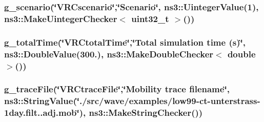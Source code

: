 \subsubsection[{\texorpdfstring{g\+\_\+scenario}{g_scenario}}]{ g\+\_\+scenario(\char`\"{}V\+R\+Cscenario\char`\"{},\char`\"{}Scenario\char`\"{}, ns3\+::\+Uinteger\+Value(1), {\bf ns3\+::\+Make\+Uinteger\+Checker}$<$ uint32\+\_\+t $>$())\hspace{0.3cm}{\ttfamily [static]}}\hypertarget{vanet-routing-compare_8cc_a85759f8a43510eb0868b9089f96b3cda}{}\label{vanet-routing-compare_8cc_a85759f8a43510eb0868b9089f96b3cda}
\subsubsection[{\texorpdfstring{g\+\_\+total\+Time}{g_totalTime}}]{ g\+\_\+total\+Time(\char`\"{}V\+R\+Ctotal\+Time\char`\"{},\char`\"{}Total simulation time ({\bf s})\char`\"{}, ns3\+::\+Double\+Value(300.), {\bf ns3\+::\+Make\+Double\+Checker}$<$ double $>$())\hspace{0.3cm}{\ttfamily [static]}}\hypertarget{vanet-routing-compare_8cc_a28d96a7067e5b8e55c51f3c5087b100c}{}\label{vanet-routing-compare_8cc_a28d96a7067e5b8e55c51f3c5087b100c}
\subsubsection[{\texorpdfstring{g\+\_\+trace\+File}{g_traceFile}}]{ g\+\_\+trace\+File(\char`\"{}V\+R\+Ctrace\+File\char`\"{},\char`\"{}Mobility trace filename\char`\"{}, ns3\+::\+String\+Value(\char`\"{}./src/wave/examples/low99-\/ct-\/unterstrass-\/1day.\+filt..\+adj.\+mob\char`\"{}), ns3\+::\+Make\+String\+Checker())\hspace{0.3cm}{\ttfamily [static]}}\hypertarget{vanet-routing-compare_8cc_af940de68de9393c1c1886cb513a1f166}{}\label{vanet-routing-compare_8cc_af940de68de9393c1c1886cb513a1f166}
